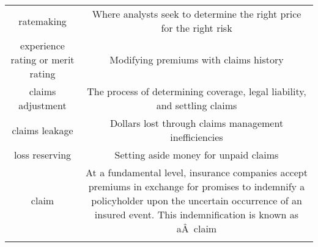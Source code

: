 \documentclass[]{book}
\theoremstyle{definition}
\theoremstyle{definition}
\theoremstyle{definition}
\theoremstyle{remark}
\begin{document}
\begin{longtable}[]{@{}cc@{}}
\begin{minipage}[t]{0.41\columnwidth}\centering\strut
ratemaking\strut
\end{minipage} & \begin{minipage}[t]{0.42\columnwidth}\centering\strut
Where analysts seek to determine the right price for the right
risk\strut
\end{minipage}\tabularnewline
\begin{minipage}[t]{0.41\columnwidth}\centering\strut
experience rating or merit rating\strut
\end{minipage} & \begin{minipage}[t]{0.42\columnwidth}\centering\strut
Modifying premiums with claims history\strut
\end{minipage}\tabularnewline
\begin{minipage}[t]{0.41\columnwidth}\centering\strut
claims adjustment\strut
\end{minipage} & \begin{minipage}[t]{0.42\columnwidth}\centering\strut
The process of determining coverage, legal liability, and settling
claims\strut
\end{minipage}\tabularnewline
\begin{minipage}[t]{0.41\columnwidth}\centering\strut
claims leakage\strut
\end{minipage} & \begin{minipage}[t]{0.42\columnwidth}\centering\strut
Dollars lost through claims management inefficiencies\strut
\end{minipage}\tabularnewline
\begin{minipage}[t]{0.41\columnwidth}\centering\strut
loss reserving\strut
\end{minipage} & \begin{minipage}[t]{0.42\columnwidth}\centering\strut
Setting aside money for unpaid claims\strut
\end{minipage}\tabularnewline
\begin{minipage}[t]{0.41\columnwidth}\centering\strut
claim\strut
\end{minipage} & \begin{minipage}[t]{0.42\columnwidth}\centering\strut
At a fundamental level, insurance companies accept premiums in exchange
for promises to indemnify a policyholder upon the uncertain occurrence
of an insured event. This indemnification is known as aÂ~claim\strut
\end{minipage}\tabularnewline
\begin{minipage}[t]{0.41\columnwidth}\centering\strut

\end{minipage}
\end{longtable}
\end{document}
